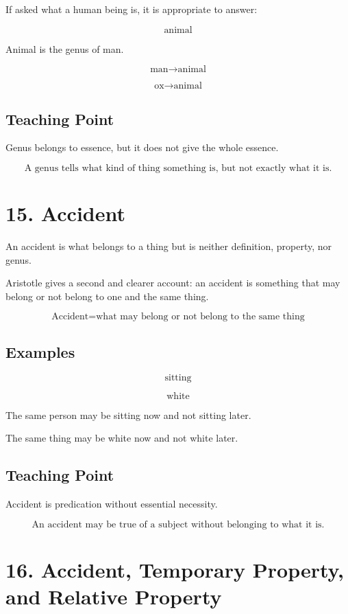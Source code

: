\documentclass[12pt]{article}
\begin{document}
If asked what a human being is, it is appropriate to answer:

\[
\text{animal}
\]

Animal is the genus of man.

\[
\text{man} \rightarrow \text{animal}
\]

\[
\text{ox} \rightarrow \text{animal}
\]

\subsection*{Teaching Point}

Genus belongs to essence, but it does not give the whole essence.

\[
\boxed{
\text{A genus tells what kind of thing something is, but not exactly what it is.}
}
\]

\section*{15. Accident}

An accident is what belongs to a thing but is neither definition, property, nor
genus.

Aristotle gives a second and clearer account: an accident is something that may
belong or not belong to one and the same thing.

\[
\boxed{
\text{Accident} = \text{what may belong or not belong to the same thing}
}
\]

\subsection*{Examples}

\[
\text{sitting}
\]

\[
\text{white}
\]

The same person may be sitting now and not sitting later.

The same thing may be white now and not white later.

\subsection*{Teaching Point}

Accident is predication without essential necessity.

\[
\boxed{
\text{An accident may be true of a subject without belonging to what it is.}
}
\]

\section*{16. Accident, Temporary Property, and Relative Property}
\end{document}
